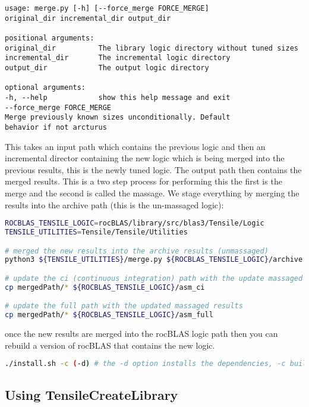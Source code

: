 \documentclass[]{article}
\begin{document}
\begin{verbatim}
usage: merge.py [-h] [--force_merge FORCE_MERGE]
original_dir incremental_dir output_dir

positional arguments:
original_dir          The library logic directory without tuned sizes
incremental_dir       The incremental logic directory
output_dir            The output logic directory

optional arguments:
-h, --help            show this help message and exit
--force_merge FORCE_MERGE
Merge previously known sizes unconditionally. Default
behavior if not arcturus
\end{verbatim}

This takes an input path which contains the previous logic and then an incremental director containing the new logic which is being merged into the previous results, this is the newly tuned logic. The output path then contains the merged results. This is a two step process for performing this the first is the merge and the second is called the massage. We stage everything by merging the results into the archive path (this is the un-massaged logic):

\begin{lstlisting}[language=bash,breaklines=true,commentstyle=\color{ForestGreen}]
ROCBLAS_TENSILE_LOGIC=rocBLAS/library/src/blas3/Tensile/Logic
TENSILE_UTILITIES=Tensile/Tensile/Utilities

# merged the new results into the archive results (unmassaged) 
python3 ${TENSILE_UTILITIES}/merge.py ${ROCBLAS_TENSILE_LOGIC}/archive newLogicPath mergedPath

# update the ci (continuous integration) path with the update massaged results
cp mergedPath/* ${ROCBLAS_TENSILE_LOGIC}/asm_ci

# update the full path with the updated massaged results
cp mergedPath/* ${ROCBLAS_TENSILE_LOGIC}/asm_full
\end{lstlisting}

once the new results are merged into the rocBLAS logic path then you can rebuild a version of rocBLAS that contains the new logic.

\begin{lstlisting}[language=bash]
./install.sh -c (-d) # the -d option installs the dependencies, -c build the client apps
\end{lstlisting}
 
\subsection{Using TensileCreateLibrary}
\end{document}
